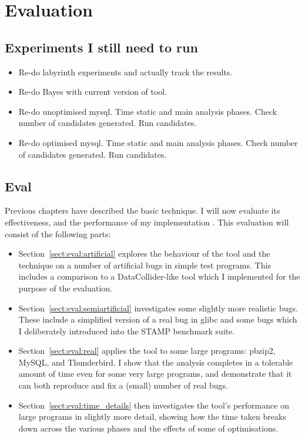 \chapter{Evaluation}
\label{chapter:eval}

\section{Experiments I still need to run}

\begin{itemize}
\item Re-do labyrinth experiments and actually track the results.
\item Re-do Bayes with current version of tool.
\item Re-do unoptimised mysql.  Time static and main analysis phases.
  Check number of candidates generated.  Run candidates.
\item Re-do optimised mysql.  Time static and main analysis phases.
  Check number of candidates generated.  Run candidates.
\end{itemize}

\section{Eval}

Previous chapters have described the basic {\technique} technique.  I
will now evaluate its effectiveness, and the performance of my
implementation {\implementation}.  This evaluation will consist of the
following parts:

\begin{itemize}
\item Section~\ref{sect:eval:artificial} explores the behaviour of the
  tool and the technique on a number of artificial bugs in simple test
  programs.  This includes a comparison to a
  DataCollider\needCite{}-like tool which I implemented for the
  purpose of the evaluation.
\item Section~\ref{sect:eval:semiartificial} investigates some
  slightly more realistic bugs.  These include a simplified version of
  a real bug in glibc\needCite{} and some bugs which I deliberately
  introduced into the STAMP benchmark suite\needCite{}.
\item Section~\ref{sect:eval:real} applies the tool to some large
  programs: pbzip2\needCite{}, MySQL\needCite{}, and
  Thunderbird\needCite{}.  I show that the analysis completes in a
  tolerable amount of time even for some very large programs,
  and demonstrate that it can both reproduce and fix a (small)
  number of real bugs.
\item Section~\ref{sect:eval:time_details} then investigates the
  tool's performance on large programs in slightly more detail,
  showing how the time taken breaks down across the various phases
  and the effects of some of {\implementation} optimisations.
\end{itemize}

